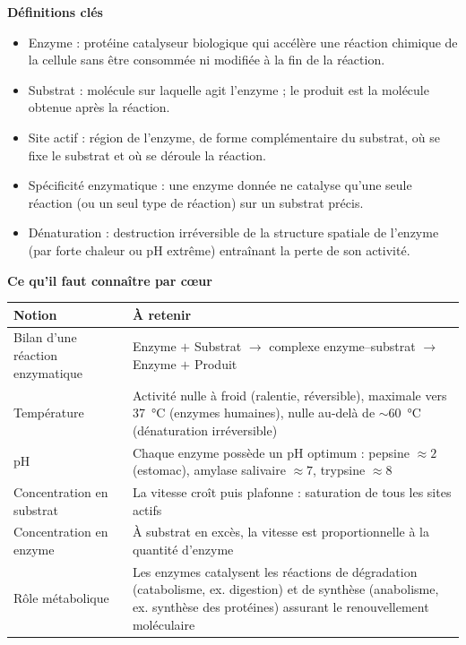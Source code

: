 \documentclass[11pt]{article}
\newcommand{\cle}[1]{{\popxbold\color{popdark}#1}}
\begin{document}
\begin{bilan}
\textbf{Définitions clés}
\begin{itemize}
  \item \cle{Enzyme} : protéine \cle{catalyseur biologique} qui accélère une réaction chimique de la cellule sans être consommée ni modifiée à la fin de la réaction.
  \item \cle{Substrat} : molécule sur laquelle agit l'enzyme ; le \cle{produit} est la molécule obtenue après la réaction.
  \item \cle{Site actif} : région de l'enzyme, de forme complémentaire du substrat, où se fixe le substrat et où se déroule la réaction.
  \item \cle{Spécificité enzymatique} : une enzyme donnée ne catalyse qu'une seule réaction (ou un seul type de réaction) sur un substrat précis.
  \item \cle{Dénaturation} : destruction irréversible de la structure spatiale de l'enzyme (par forte chaleur ou pH extrême) entraînant la perte de son activité.
\end{itemize}

\textbf{Ce qu'il faut connaître par c\oe ur}
\begin{center}
\begin{tabularx}{\linewidth}{|l|X|}\hline
\rowcolor{popblueL} \textbf{Notion} & \textbf{À retenir} \\ \hline
Bilan d'une réaction enzymatique & Enzyme $+$ Substrat $\rightarrow$ complexe enzyme--substrat $\rightarrow$ Enzyme $+$ Produit \\ \hline
Température & Activité nulle à froid (ralentie, réversible), maximale vers \SI{37}{\celsius} (enzymes humaines), nulle au-delà de $\sim$\SI{60}{\celsius} (dénaturation irréversible) \\ \hline
pH & Chaque enzyme possède un \cle{pH optimum} : pepsine $\approx 2$ (estomac), amylase salivaire $\approx 7$, trypsine $\approx 8$ \\ \hline
Concentration en substrat & La vitesse croît puis plafonne : \cle{saturation} de tous les sites actifs \\ \hline
Concentration en enzyme & À substrat en excès, la vitesse est proportionnelle à la quantité d'enzyme \\ \hline
Rôle métabolique & Les enzymes catalysent les réactions de \cle{dégradation} (catabolisme, ex. digestion) et de \cle{synthèse} (anabolisme, ex. synthèse des protéines) assurant le renouvellement moléculaire \\ \hline
\end{tabularx}
\end{center}


\end{bilan}
\end{document}
